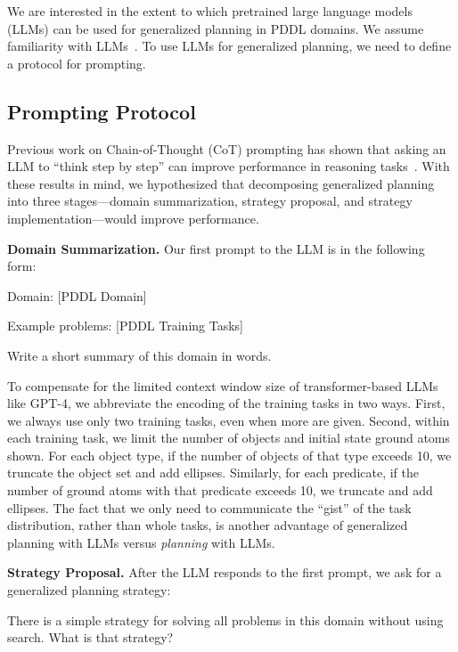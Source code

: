 \documentclass[letterpaper]{article} %
\begin{document}
We are interested in the extent to which pretrained large language models (LLMs) can be used for generalized planning in PDDL domains.
We assume familiarity with LLMs~\citep{brown2020language,chen2021evaluating,chowdhery2022palm,openai2023gpt4}.
To use LLMs for generalized planning, we need to define a protocol for prompting.

\subsection{Prompting Protocol}

Previous work on Chain-of-Thought (CoT) prompting has shown that asking an LLM to ``think step by step'' can improve performance in reasoning tasks~\cite{wei2022chain}.
With these results in mind, we hypothesized that decomposing generalized planning into three stages---domain summarization, strategy proposal, and strategy implementation---would improve performance.

\textbf{Domain Summarization.}
Our first prompt to the LLM is in the following form:

\begin{tcolorbox}[left=2pt,right=2pt]
Domain: [PDDL Domain]

Example problems: [PDDL Training Tasks]

Write a short summary of this domain in words.
\end{tcolorbox}

To compensate for the limited context window size of transformer-based LLMs like GPT-4, we abbreviate the encoding of the training tasks in two ways.
First, we always use only two training tasks, even when more are given.
Second, within each training task, we limit the number of objects and initial state ground atoms shown.
For each object type, if the number of objects of that type exceeds 10, we truncate the object set and add ellipses.
Similarly, for each predicate, if the number of ground atoms with that predicate exceeds 10, we truncate and add ellipses.
The fact that we only need to communicate the ``gist'' of the task distribution, rather than whole tasks, is another advantage of generalized planning with LLMs versus \emph{planning} with LLMs.

\textbf{Strategy Proposal.}
After the LLM responds to the first prompt, we ask for a generalized planning strategy:

\begin{tcolorbox}[left=2pt,right=2pt]
There is a simple strategy for solving all problems in this domain without using search. What is that strategy?
\end{tcolorbox}
\end{document}
